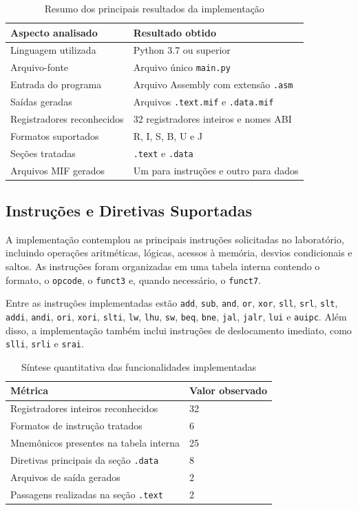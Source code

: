\documentclass[conference]{IEEEtran}
\begin{document}
\begin{table}[!ht]
\centering
\caption{Resumo dos principais resultados da implementação}
\label{tab:resultados_implementacao}
\begin{tabular}{ll}
\toprule
Aspecto analisado & Resultado obtido \\
\midrule
Linguagem utilizada & Python 3.7 ou superior \\
Arquivo-fonte & Arquivo único \texttt{main.py} \\
Entrada do programa & Arquivo Assembly com extensão \texttt{.asm} \\
Saídas geradas & Arquivos \texttt{.text.mif} e \texttt{.data.mif} \\
Registradores reconhecidos & 32 registradores inteiros e nomes ABI \\
Formatos suportados & R, I, S, B, U e J \\
Seções tratadas & \texttt{.text} e \texttt{.data} \\
Arquivos MIF gerados & Um para instruções e outro para dados \\
\bottomrule
\end{tabular}
\end{table}

\subsection{Instruções e Diretivas Suportadas}

A implementação contemplou as principais instruções solicitadas no laboratório, incluindo operações aritméticas, lógicas, acessos à memória, desvios condicionais e saltos. As instruções foram organizadas em uma tabela interna contendo o formato, o \texttt{opcode}, o \texttt{funct3} e, quando necessário, o \texttt{funct7}.

Entre as instruções implementadas estão \texttt{add}, \texttt{sub}, \texttt{and}, \texttt{or}, \texttt{xor}, \texttt{sll}, \texttt{srl}, \texttt{slt}, \texttt{addi}, \texttt{andi}, \texttt{ori}, \texttt{xori}, \texttt{slti}, \texttt{lw}, \texttt{lhu}, \texttt{sw}, \texttt{beq}, \texttt{bne}, \texttt{jal}, \texttt{jalr}, \texttt{lui} e \texttt{auipc}. Além disso, a implementação também inclui instruções de deslocamento imediato, como \texttt{slli}, \texttt{srli} e \texttt{srai}.

\begin{table}[!ht]
\centering
\caption{Síntese quantitativa das funcionalidades implementadas}
\label{tab:sintese_quantitativa}
\begin{tabular}{ll}
\toprule
Métrica & Valor observado \\
\midrule
Registradores inteiros reconhecidos & 32 \\
Formatos de instrução tratados & 6 \\
Mnemônicos presentes na tabela interna & 25 \\
Diretivas principais da seção \texttt{.data} & 8 \\
Arquivos de saída gerados & 2 \\
Passagens realizadas na seção \texttt{.text} & 2 \\
\bottomrule
\end{tabular}
\end{table}
\end{document}
